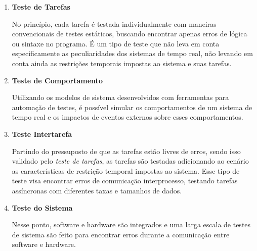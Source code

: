 \begin{enumerate}
\item \textbf{Teste de Tarefas}

No princípio, cada tarefa é testada individualmente com maneiras convencionais de testes estáticos, buscando encontrar
apenas erros de lógica ou sintaxe no programa. É um tipo de teste que não leva em conta especificamente as peculiaridades
dos sistemas de tempo real, não levando em conta ainda as restrições temporais impostas ao sistema e suas tarefas.


\item \textbf{Teste de Comportamento}

Utilizando os modelos de sistema desenvolvidos com ferramentas para automação de testes, é possível simular os comportamentos
de um sistema de tempo real e os impactos de eventos externos sobre esses comportamentos.


\item \textbf{Teste Intertarefa}

Partindo do pressuposto de que as tarefas estão livres de erros, sendo isso validado pelo \textit{teste de tarefas}, as tarefas são
testadas adicionando ao cenário as características de restrição temporal impostas ao sistema. Esse tipo de teste visa encontrar
erros de comunicação interprocesso, testando tarefas assíncronas com diferentes taxas e tamanhos de dados.


\item \textbf{Teste do Sistema}

Nesse ponto, software e hardware são integrados e uma larga escala de testes de sistema são feito para encontrar erros durante
a comunicação entre software e hardware.


\end{enumerate}
